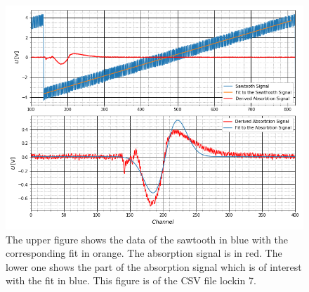 	\begin{figure}[h]
		\includegraphics[scale=0.5]{Bild/LockIn7.png}
		\centering
		\caption[Plots and Fits of Lock-In Method 7]{\small The upper figure shows the data of the sawtooth in blue with the corresponding fit in orange. The absorption signal is in red. The lower one shows the part of the absorption signal which is of interest with the fit in blue. This figure is of the CSV file lockin 7.}
		\label{Lock7}
	\end{figure}
